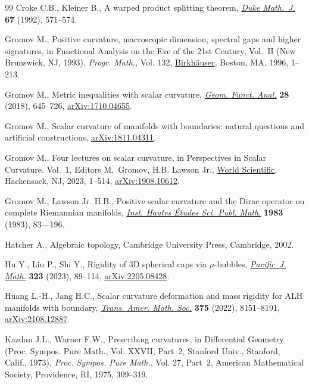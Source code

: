 \begin{thebibliography}{99}
Croke C.B., Kleiner B., A warped product splitting theorem, \href{https://doi.org/10.1215/S0012-7094-92-06723-8}{\textit{Duke
  Math.~J.}} \textbf{67} (1992), 571--574.


Gromov M., Positive curvature, macroscopic dimension, spectral gaps and higher
  signatures, in Functional Analysis on the Eve of the 21st Century,
  {V}ol.~{II} ({N}ew {B}runswick, {NJ}, 1993), \textit{Progr. Math.}, Vol. 132,
  \href{https://doi.org/10.1007/s10107-010-0354-x}{Birkh\"auser}, Boston, MA, 1996, 1--213.

 Gromov  M., Metric inequalities with scalar curvature, \href{https://doi.org/10.1007/s00039-018-0453-z}{\textit{Geom. Funct. Anal.}} \textbf{28} (2018), 645--726,
 \href{https://arxiv.org/abs/1710.04655}{arXiv:1710.04655}.

Gromov M., Scalar curvature of manifolds with boundaries: natural questions and
  artificial constructions, \href{https://arxiv.org/abs/1811.04311}{arXiv:1811.04311}.

Gromov M., Four lectures on scalar curvature, in Perspectives in Scalar
  Curvature. {V}ol.~1, Editors M.~Gromov, H.B. Lawson Jr., \href{https://doi.org/10.1007/10.1142/9789811273223_000}{World Scientific},
  Hackensack, NJ, 2023, 1--514, \href{https://arxiv.org/abs/1908.10612}{arXiv:1908.10612}.

Gromov M., Lawson Jr. H.B., Positive scalar curvature and the {D}irac operator
  on complete {R}iemannian manifolds, \href{https://doi.org/10.1007/BF02953774}{\textit{Inst. Hautes \'Etudes Sci. Publ.
  Math.}} \textbf{1983} (1983), 83---196.

Hatcher A., Algebraic topology, Cambridge University Press, Cambridge, 2002.

Hu Y., Liu P., Shi Y., Rigidity of 3{D} spherical caps via {$\mu$}-bubbles,
  \href{https://doi.org/10.2140/pjm.2023.323.89}{\textit{Pacific~J. Math.}} \textbf{323} (2023), 89--114, \href{https://arxiv.org/abs/2205.08428}{arXiv:2205.08428}.

Huang L.-H., Jang H.C., Scalar curvature deformation and mass rigidity for {ALH}
  manifolds with boundary, \href{https://doi.org/10.1090/tran/8755}{\textit{Trans. Amer. Math. Soc.}} \textbf{375}
  (2022), 8151--8191, \href{https://arxiv.org/abs/2108.12887}{arXiv:2108.12887}.

Kazdan J.L., Warner F.W., Prescribing curvatures, in Differential {G}eometry
  ({P}roc. {S}ympos. {P}ure {M}ath., {V}ol. {XXVII}, {P}art~2, {S}tanford
  {U}niv., {S}tanford, {C}alif., 1973), \textit{Proc. Sympos. Pure Math.}, Vol.
  27, Part~2, American Mathematical Society, Providence, RI, 1975, 309--319.


\end{thebibliography}
